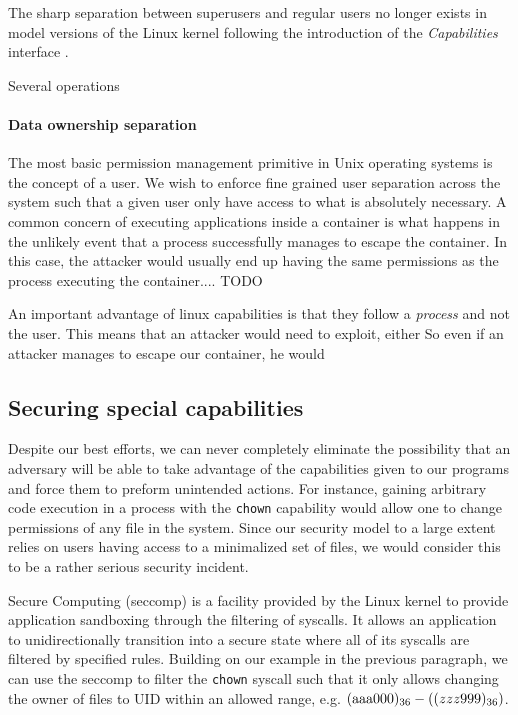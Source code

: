 
The sharp separation between superusers and regular users no longer
exists in model versions of the Linux kernel following the
introduction of the \textit{Capabilities} interface \cite{cap7}. 

Several operations 

\paragraph{Data ownership separation}
The most basic permission management primitive in Unix operating
systems is the concept of a user. We wish to enforce fine grained user
separation across the system such that a given user only have access
to what is absolutely necessary. A common concern of executing
applications inside a container is what happens in the unlikely event
that a process successfully manages to escape the container. In this
case, the attacker would usually end up having the same permissions as
the process executing the container.... TODO

An important advantage of linux capabilities is that they follow a
\textit{process} and not the user. This means that an attacker would
need to exploit, either So even if an attacker manages to
escape our container, he would 

\subsection{Securing special capabilities}
Despite our best efforts, we can never completely eliminate the
possibility that an adversary will be able to take advantage of the
capabilities given to our programs and force them to preform
unintended actions. For instance, gaining arbitrary code execution in
a process with the \texttt{chown} capability would allow one to change
permissions of any file in the system. Since our security model to a
large extent relies on users having access to a minimalized set of
files, we would consider this to be a rather serious security
incident.

Secure Computing (seccomp) \cite{manpage} is a facility provided by
the Linux kernel to provide application sandboxing through the
filtering of syscalls. It allows an application to unidirectionally
transition into a secure state where all of its syscalls are filtered
by specified rules. Building on our example in the previous paragraph,
we can use the seccomp to filter the \texttt{chown} syscall such that
it only allows changing the owner of files to UID within an allowed
range, e.g. $(\text{aaa000})_{36} - (\text(zzz999)_{36})$.

